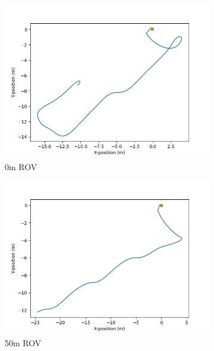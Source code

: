 \documentclass[class=article, crop=false]{standalone}
\begin{document}
\begin{figure}
    \centering
    \begin{subfigure}{0.7\textwidth}
        \centering
        \includegraphics{scenario1/rov-0m/1.0m/usv_position_controlled}
        \caption{0m ROV}
    \end{subfigure}
    \vfill
    \begin{subfigure}{0.7\textwidth}
        \centering
        \includegraphics{scenario1/rov-50m/1.0m/usv_position_controlled}
        \caption{50m ROV}
    \end{subfigure}
    \vfill
    \begin{subfigure}{0.7\textwidth}
        \centering

\end{subfigure}
\end{figure}
\end{document}
